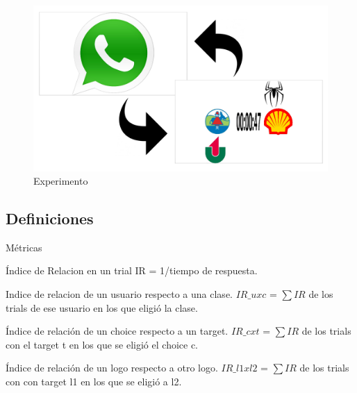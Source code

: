 \documentclass{beamer}
\begin{document}
\begin{frame}
\begin{figure}[h]
 \centering
  \begin{minipage}[c]{1\textwidth}
	\centering	
	\includegraphics[scale=0.16]{exp.png}
        \caption{Experimento}
  \end{minipage}
\end{figure}
\end{frame}


\subsection{Definiciones}

\begin{frame}{Métricas}
\begin{block}{Índice de Relacion en un trial}
IR = 1/tiempo de respuesta. 
\end{block}

\begin{block}{Indice de relacion de un usuario respecto a una clase.}
$IR\_uxc$ = $\sum IR$ de los trials de ese usuario en los que eligió la clase.
\end{block}

\begin{block}{Índice de relación de un choice respecto a un target.}
$IR\_cxt$ = $\sum IR$ de los trials con el target t en los que se eligió el choice c.
\end{block}

\begin{block}{Índice de relación de un logo respecto a otro logo.}
$IR\_l1xl2$ = $\sum IR$ de los trials con con target l1 en los que se eligió a l2.
\end{block}

\end{frame}
\end{document}
